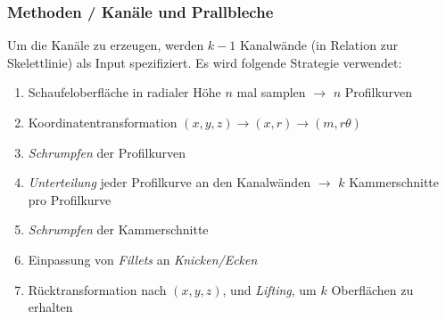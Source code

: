 \documentclass[8pt, aspectratio=169]{beamer}
\begin{document}
\begin{frame}
	\frametitle{Methoden / Kanäle und Prallbleche}
	\vspace{-1cm}\hspace{-0.5cm}
	\begin{minipage}[t]{\textwidth}
		Um die Kanäle zu erzeugen, werden $k-1$ Kanalwände (in Relation zur Skelettlinie) als Input spezifiziert.
		Es wird folgende Strategie verwendet:
		\begin{enumerate}
			\item Schaufeloberfläche in radialer Höhe $n$ mal samplen $\rightarrow$ $n$ Profilkurven
			\item Koordinatentransformation $(x, y, z) \rightarrow (x, r) \rightarrow (m, r\theta)$
			\item \emph{Schrumpfen} der Profilkurven
			\item \emph{Unterteilung} jeder Profilkurve an den Kanalwänden $\rightarrow$ $k$ Kammerschnitte pro Profilkurve
			\item \emph{Schrumpfen} der Kammerschnitte
			\item Einpassung von \emph{Fillets} an \emph{Knicken/Ecken}
			\item Rücktransformation nach $(x, y, z)$, und \emph{Lifting}, um $k$ Oberflächen zu erhalten
		\end{enumerate}
	\end{minipage}
	\vfill
\end{frame}
\end{document}
